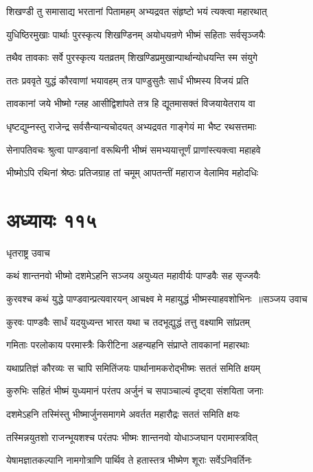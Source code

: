\twolineshloka
{शिखण्डी तु समासाद्य भरतानां पितामहम्}
{अभ्यद्रवत संहृष्टो भयं त्यक्त्वा महारथात्}


\twolineshloka
{युधिष्ठिरमुखाः पार्थाः पुरस्कृत्य शिखण्डिनम्}
{अयोधयन्रणे भीष्मं सहिताः सर्वसृञ्जयैः}


\twolineshloka
{तथैव तावकाः सर्वे पुरस्कृत्य यतव्रतम्}
{शिखण्डिप्रमुखान्पार्थान्योधयन्ति स्म संयुगे}


\twolineshloka
{ततः प्रववृते युद्धं कौरवाणां भयावहम्}
{तत्र पाण्डुसुतैः सार्धं भीष्मस्य विजयं प्रति}


\twolineshloka
{तावकानां जये भीष्मो ग्लह आसीद्विशांपते}
{तत्र हि द्यूतमासक्तं विजयायेतराय वा}


\twolineshloka
{धृष्टद्युम्नस्तु राजेन्द्र सर्वसैन्यान्यचोदयत्}
{अभ्यद्रवत गाङ्गेयं मा भैष्ट रथसत्तमाः}


\twolineshloka
{सेनापतिवचः श्रुत्वा पाण्डवानां वरूथिनी}
{भीष्मं समभ्ययात्तूर्णं प्राणांस्त्यक्त्वा महाहवे}


\twolineshloka
{भीष्मोऽपि रथिनां श्रेष्ठः प्रतिजग्राह तां चमूम्}
{आपतन्तीं महाराज वेलामिव महोदधिः}


\chapter{अध्यायः ११५}
\twolineshloka
{धृतराष्ट्र उवाच}
{}


\twolineshloka
{कथं शान्तनवो भीष्मो दशमेऽहनि सञ्जय}
{अयुध्यत महावीर्यः पाण्डवैः सह सृज्जयैः}


\threelineshloka
{कुरवश्च कथं युद्धे पाण्डवान्प्रत्यवारयन्}
{आचक्ष्व मे महायुद्धं भीष्मस्याहवशोभिनः ॥सञ्जय उवाच}
{}


\twolineshloka
{कुरवः पाण्डवैः सार्धं यदयुध्यन्त भारत}
{यथा च तदभूद्युद्धं तत्तु वक्ष्यामि सांप्रतम्}


\twolineshloka
{गमिताः परलोकाय परमास्त्रैः किरीटिना}
{अहन्यहनि संप्राप्ते तावकानां महारथाः}


\twolineshloka
{यथाप्रतिज्ञं कौरव्यः स चापि समितिंजयः}
{पार्थानामकरोद्भीष्मः सततं समिति क्षयम्}


\twolineshloka
{कुरुभिः सहितं भीष्मं युध्यमानं परंतप}
{अर्जुनं च सपाञ्चाल्यं दृष्ट्वा संशयिता जनाः}


\twolineshloka
{दशमेऽहनि तस्मिंस्तु भीष्मार्जुनसमागमे}
{अवर्तत महारौद्रः सततं समिति क्षयः}


\twolineshloka
{तस्मिन्नयुतशो राजन्भूयशश्च परंतपः}
{भीष्मः शान्तनवो योधाञ्जघान परामास्त्रवित्}


\twolineshloka
{येषामज्ञातकल्पानि नामगोत्राणि पार्थिव}
{ते हतास्तत्र भीष्मेण शूराः सर्वेऽनिवर्तिनः}


